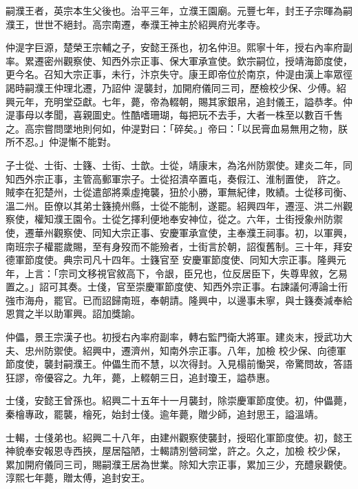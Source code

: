 \begin{pinyinscope}
 嗣濮王者，英宗本生父後也。治平三年，立濮王園廟。元豐七年，封王子宗暉為嗣濮王，世世不絕封。高宗南遷，奉濮王神主於紹興府光孝寺。



 仲湜字巨源，楚榮王宗輔之子，安懿王孫也，初名仲泹。熙寧十年，授右內率府副率。累遷密州觀察使、知西外宗正事、保大軍承宣使。欽宗嗣位，授靖海節度使，更今名。召知大宗正事，未行，汴京失守。康王即帝位於南京，仲湜由漢上率眾徑謁時嗣濮王仲理北遷，乃詔仲
 湜襲封，加開府儀同三司，歷檢校少保、少傅。紹興元年，充明堂亞獻。七年，薨，帝為輟朝，賜其家銀帛，追封儀王，謚恭孝。仲湜事母以孝聞，喜親圖史。性酷嗜珊瑚，每把玩不去手，大者一株至以數百千售之。高宗嘗問墜地則何如，仲湜對曰：「碎矣。」帝曰：「以民膏血易無用之物，朕所不忍。」仲湜慚不能對。



 子士從、士街、士籛、士街、士歆。士從，靖康末，為洺州防禦使。建炎二年，同知西外宗正事，主管高郵軍宗子。士從招潰卒置屯，奏假江、淮制置使，
 許之。賊李在犯楚州，士從遣部將乘虛掩襲，狃於小勝，軍無紀律，敗績。士從移司衡、溫二州。臣僚以其弟士籛撓州縣，士從不能制，遂罷。紹興四年，遷涇、洪二州觀察使，權知濮王園令。士從乞擇利便地奉安神位，從之。六年，士街授象州防禦使，遷華州觀察使、同知大宗正事、安慶軍承宣使，主奉濮王祠事。初，以軍興，南班宗子權罷歲賜，至有身歿而不能殮者，士街言於朝，詔復舊制。三十年，拜安德軍節度使。典宗司凡十四年。士籛官至
 安慶軍節度使、同知大宗正事。隆興元年，上言：「宗司文移視官敘高下，令詪，臣兄也，位反居臣下，失尊卑敘，乞易置之。」詔可其奏。士俴，官至崇慶軍節度使、知西外宗正事。右諫議何溥論士衎強市海舟，罷官。已而詔歸南班，奉朝請。隆興中，以邊事未寧，與士籛奏減奉給恩賞之半以助軍興。詔加獎諭。



 仲儡，景王宗漢子也。初授右內率府副率，轉右監門衛大將軍。建炎末，授武功大夫、忠州防禦使。紹興中，遷濟州，知南外宗正事。八年，加檢
 校少保、向德軍節度使，襲封嗣濮王。仲儡生而不慧，以次得封。入見榻前慟哭，帝驚問故，答語狂謬，帝優容之。九年，薨，上輟朝三日，追封瓊王，謚恭惠。



 士俴，安懿王曾孫也。紹興二十五年十一月襲封，除崇慶軍節度使。初，仲儡薨，秦檜專政，罷襲，檜死，始封士俴。逾年薨，贈少師，追封思王，謚溫靖。



 士輵，士俴弟也。紹興二十八年，由建州觀察使襲封，授昭化軍節度使。初，懿王神貌奉安報恩寺西挾，屋居隘陋，士輵請別營祠堂，許之。久之，加檢
 校少保，累加開府儀同三司，賜嗣濮王居為世業。除知大宗正事，累加三少，充醴泉觀使。淳熙七年薨，贈太傅，追封安王。




\end{pinyinscope}
